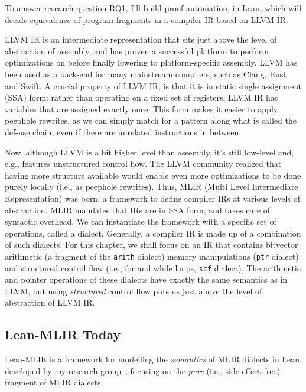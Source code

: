\documentclass[a4paper]{scrartcl}
\begin{document}
To answer research question \textsc{RQ1}, I'll build proof automation, in Lean,
which will decide equivalence of program fragments in a compiler IR based on LLVM IR.

LLVM IR is an intermediate representation that sits just above the level
of abstraction of assembly, and has proven a successful platform to
perform optimizations on before finally lowering to platform-specific
assembly. LLVM has been used as a back-end for many mainstream
compilers, such as Clang, Rust and Swift. A crucial property of LLVM IR, is that it is in static single assignment
(SSA) form: rather than operating on a fixed set of registers, LLVM IR
has variables that are assigned exactly once. This form makes it easier
to apply peephole rewrites, as we can simply match for a pattern along
what is called the def-use chain, even if there are unrelated
instructions in between.

Now, although LLVM is a bit higher level than assembly, it's still
low-level and, e.g., features unstructured control flow. The LLVM
community realized that having more structure available would enable
even more optimizations to be done purely locally (i.e., as peephole
rewrites). Thus, MLIR (Multi Level Intermediate Representation) was
born: a framework to define compiler IRs at various levels of
abstraction. MLIR mandates that IRs are in SSA form, and takes care of
syntactic overhead. We can instantiate the framework with a specific set
of operations, called a dialect. Generally, a compiler IR is made up of
a combination of such dialects. For this chapter, we shall focus on an
IR that contains bitvector arithmetic (a fragment of the \texttt{arith}
dialect) memory manipulations (\texttt{ptr} dialect) and structured
control flow (i.e., for and while loops, \texttt{scf} dialect). 
The arithmetic and pointer operations of these dialects have exactly the same semantics as in LLVM, 
but using \emph{structured} control flow puts us just above the level of abstraction of LLVM IR.

\subsection{Lean-MLIR Today}\label{Lean-MLIR-today}

Lean-MLIR is a framework for modelling the \emph{semantics} of MLIR
dialects in Lean, developed by my research group~\cite{bhatVerifyingPeepholeRewriting2024}, focusing on the
\emph{pure} (i.e., side-effect-free) fragment of MLIR dialects.
\end{document}
